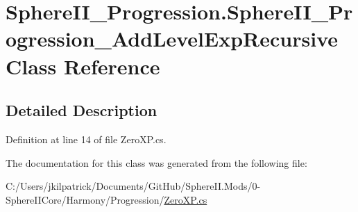 \hypertarget{class_sphere_i_i___progression_1_1_sphere_i_i___progression___add_level_exp_recursive}{}\section{Sphere\+I\+I\+\_\+\+Progression.\+Sphere\+I\+I\+\_\+\+Progression\+\_\+\+Add\+Level\+Exp\+Recursive Class Reference}
\label{class_sphere_i_i___progression_1_1_sphere_i_i___progression___add_level_exp_recursive}


\subsection{Detailed Description}


Definition at line 14 of file Zero\+X\+P.\+cs.



The documentation for this class was generated from the following file\+:\begin{DoxyCompactItemize}
\item 
C\+:/\+Users/jkilpatrick/\+Documents/\+Git\+Hub/\+Sphere\+I\+I.\+Mods/0-\/\+Sphere\+I\+I\+Core/\+Harmony/\+Progression/\mbox{\hyperlink{_zero_x_p_8cs}{Zero\+X\+P.\+cs}}\end{DoxyCompactItemize}

